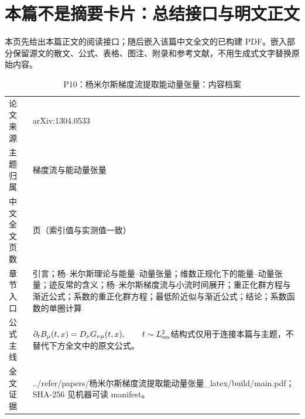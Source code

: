 \documentclass[UTF8,11pt,oneside]{ctexbook}
\begin{document}
\section*{本篇不是摘要卡片：总结接口与明文正文}
本页先给出本篇正文的阅读接口；随后嵌入该篇中文全文的已构建 PDF。嵌入部分保留源文的散文、公式、表格、图注、附录和参考文献，不用生成式文字替换原始内容。
\begin{table}[htbp]
  \centering
  \caption{P10：杨米尔斯梯度流提取能动量张量：内容档案}
  \small
  \begin{tabularx}{0.96\textwidth}{@{}p{3.3cm}>{\raggedright\arraybackslash}X@{}}
    \toprule
    论文来源 & arXiv:1304.0533 \\
    主题归属 & 梯度流与能动量张量 \\
    中文全文页数 & 16 页（索引值与实测值一致） \\
    章节入口 & 引言；杨–米尔斯理论与能量–动量张量；维数正规化下的能量–动量张量；迹反常的含义；杨–米尔斯梯度流与小流时间展开；重正化群方程与渐近公式；系数的重正化群方程；最低阶近似与渐近公式；结论；系数函数的单圈计算 \\
    公式主线 & $\partial_t B_\mu(t,x)=D_\nu G_{\nu\mu}(t,x),\qquad t\sim L_{\rm sm}^{2}$\newline\scriptsize 结构式仅用于连接本篇与主题，不替代下方全文中的原文公式。 \\
    全文证据 & ../\allowbreak{}refer/\allowbreak{}papers/\allowbreak{}杨米尔斯梯度流提取能动量张量\_\allowbreak{}latex/\allowbreak{}build/\allowbreak{}main.pdf；SHA-256 见机器可读 manifest。 \\
    \bottomrule
  \end{tabularx}
\end{table}
\end{document}
